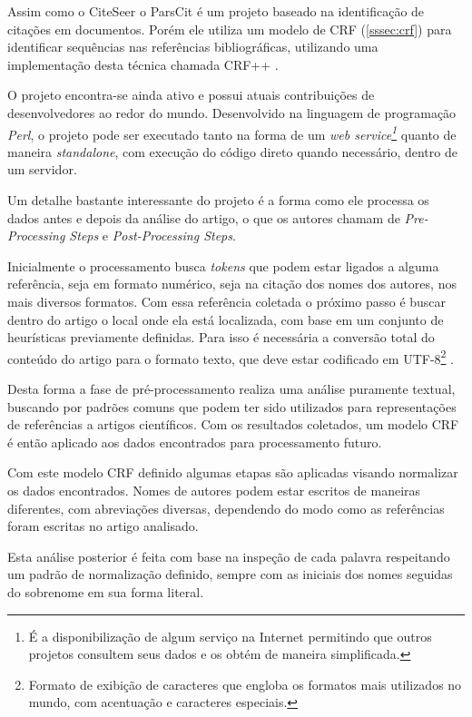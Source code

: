 Assim como o CiteSeer o ParsCit é um projeto baseado na identificação de citações em documentos. Porém ele utiliza um modelo de CRF (\autoref{sssec:crf}) para identificar sequências nas referências bibliográficas, utilizando uma implementação desta técnica chamada CRF++ \cite{Councill-Giles-2008-ParsCit}.

O projeto encontra-se ainda ativo e possui atuais contribuições de desenvolvedores ao redor do mundo. Desenvolvido na linguagem de programação \textit{Perl}, o projeto pode ser executado tanto na forma de um \textit{web service\footnote{É a disponibilização de algum serviço na Internet permitindo que outros projetos consultem seus dados e os obtém de maneira simplificada.}} quanto de maneira \textit{standalone}, com execução do código direto quando necessário, dentro de um servidor.

Um detalhe bastante interessante do projeto é a forma como ele processa os dados antes e depois da análise do artigo, o que os autores chamam de \textit{Pre-Processing Steps} e \textit{Post-Processing Steps}.

Inicialmente o processamento busca \textit{tokens} que podem estar ligados a alguma referência, seja em formato numérico, seja na citação dos nomes dos autores, nos mais diversos formatos. Com essa referência coletada o próximo passo é buscar dentro do artigo o local onde ela está localizada, com base em um conjunto de heurísticas previamente definidas. Para isso é necessária a conversão total do conteúdo do artigo para o formato texto, que deve estar codificado em UTF-8\footnote{Formato de exibição de caracteres que engloba os formatos mais utilizados no mundo, com acentuação e caracteres especiais.} \cite{Councill-Giles-2008-ParsCit}.

Desta forma a fase de pré-processamento realiza uma análise puramente textual, buscando por padrões comuns que podem ter sido utilizados para representações de referências a artigos científicos. Com os resultados coletados, um modelo CRF é então aplicado aos dados encontrados para processamento futuro.

Com este modelo CRF definido algumas etapas são aplicadas visando normalizar os dados encontrados. Nomes de autores podem estar escritos de maneiras diferentes, com abreviações diversas, dependendo do modo como as referências foram escritas no artigo analisado.

Esta análise posterior é feita com base na inspeção de cada palavra respeitando um padrão de normalização definido, sempre com as iniciais dos nomes seguidas do sobrenome em sua forma literal.

